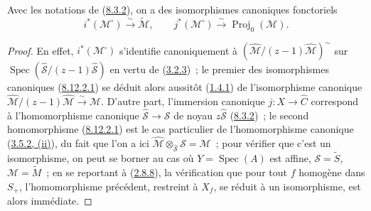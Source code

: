 \begin{proposition}[8.12.2]
\label{II.8.12.2-fr}
Avec les notations de (\hyperref[II.8.3.2-fr]{8.3.2}), on a des
isomorphismes canoniques fonctoriels
\begin{equation}
\label{II.8.12.2.1-fr}
  i^*(\mathcal{M}^{\square})\xrightarrow{\sim}\widetilde{\mathcal{M}},
  \qquad
  j^*(\mathcal{M}^{\square})\xrightarrow{\sim}
  \operatorname{Proj}_0(\mathcal{M}).
\tag{8.12.2.1}
\end{equation}
\end{proposition}

\begin{proof}
En effet, $i^*(\mathcal{M}^{\square})$ s'identifie canoniquement à
$\left(\widehat{\mathcal{M}}/(z-1)\widehat{\mathcal{M}}\right)^{\sim}$
sur
$\operatorname{Spec}(\widehat{\mathcal{S}}/(z-1)\widehat{\mathcal{S}})$
en vertu de (\hyperref[II.3.2.3-fr]{3.2.3})~; le premier des isomorphismes
canoniques (\hyperref[II.8.12.2.1-fr]{8.12.2.1}) se déduit alors aussitôt
(\hyperref[II.1.4.1-fr]{1.4.1}) de l'isomorphisme canonique
$\widehat{\mathcal{M}}/(z-1)\widehat{\mathcal{M}}
\xrightarrow{\sim}\mathcal{M}$. D'autre part, l'immersion canonique
$j:X\to\widehat{C}$ correspond à l'homomorphisme canonique
$\widehat{\mathcal{S}}\to\mathcal{S}$ de noyau
$z\widehat{\mathcal{S}}$ (\hyperref[II.8.3.2-fr]{8.3.2})~; le second
homomorphisme (\hyperref[II.8.12.2.1-fr]{8.12.2.1}) est le cas particulier
de l'homomorphisme canonique (\hyperref[II.3.5.2-fr]{3.5.2, (ii)}), du fait
que l'on a ici
$\widehat{\mathcal{M}}\otimes_{\widehat{\mathcal{S}}}\mathcal{S}
=\mathcal{M}$~; pour vérifier que c'est un isomorphisme, on peut se borner au
cas où $Y=\operatorname{Spec}(A)$ est affine,
$\mathcal{S}=\widetilde{S}$, $\mathcal{M}=\widetilde{M}$~; en se reportant à
(\hyperref[II.2.8.8-fr]{2.8.8}), la vérification que pour tout $f$ homogène
dans $S_+$, l'homomorphisme précédent, restreint à $X_f$, se réduit à un
isomorphisme, est alors immédiate.
\end{proof}

